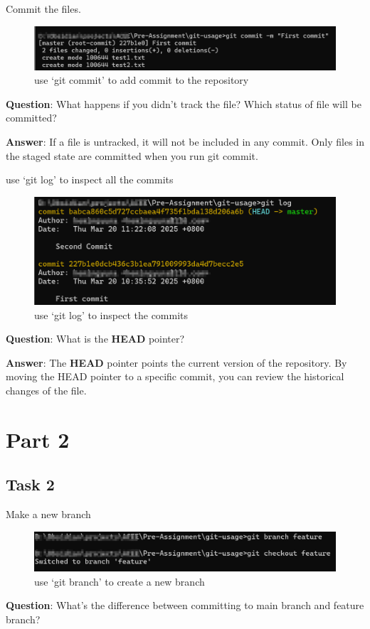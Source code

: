 \documentclass{article}
\begin{document}
Commit the files.
\begin{figure}[H]
\centering
\includegraphics[width = \textwidth]{../figures/commit.png}
\caption{use `git commit' to add commit to the repository}
\end{figure}
\textbf{Question}: What happens if you didn't track the file? Which status of file will be committed?

\textbf{Answer}: If a file is untracked, it will not be included in any commit. Only files in the staged state are committed when you run git commit.

use `git log' to inspect all the commits
\begin{figure}[H]
\centering
\includegraphics[width = \textwidth]{../figures/log.png}
\caption{use `git log' to inspect the commits}
\end{figure}

\textbf{Question}:  What is the \textbf{HEAD} pointer?

\textbf{Answer}: The \textbf{HEAD} pointer points the current version of the repository. By moving the HEAD pointer to a specific commit, you can review the historical changes of the file.

\section{Part 2}
\subsection{Task 2}
Make a new branch
\begin{figure}[H]
\centering
\includegraphics[width = \textwidth]{../figures/new_branch.png}
\caption{use `git branch' to create a new branch}
\end{figure}
\textbf{Question}: What's the difference between committing to main branch and feature branch?
\end{document}
